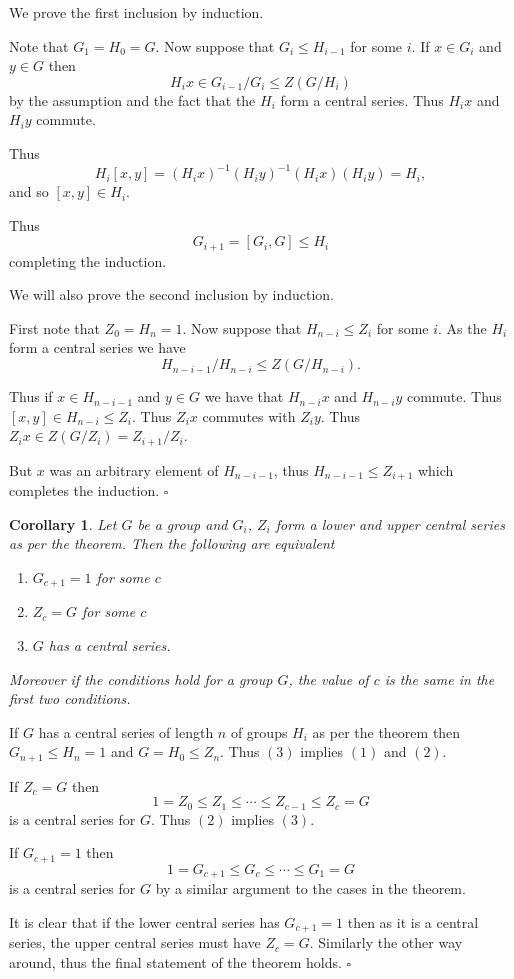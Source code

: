 \documentclass[10pt]{article}
\newtheorem{corollary}[theorem]{Corollary}
\newenvironment{proof}[1][Proof]{\begin{trivlist}
\item[\hskip \labelsep {\itshape #1}]}{\end{trivlist}}
\begin{document}
\begin{proof}
We prove the first inclusion by induction.

Note that $G_1 = H_0 = G$. Now suppose that $G_i \leq H_{i-1}$ for some $i$. If $x \in G_i$ and $y \in G$ then
$$H_ix \in G_{i-1}/G_i \leq Z(G/H_i)$$
by the assumption and the fact that the $H_i$ form a central series. Thus $H_ix$ and $H_iy$ commute.

Thus
$$H_i[x, y] = (H_ix)^{-1}(H_iy)^{-1}(H_ix)(H_iy) = H_i,$$
and so $[x, y] \in H_i$.

Thus $$G_{i+1} = [G_i, G] \leq H_i$$ completing the induction.

We will also prove the second inclusion by induction.

First note that $Z_0 = H_n = 1$. Now suppose that $H_{n-i} \leq Z_i$ for some $i$. As the $H_i$ form a central series we have
$$H_{n-i-1}/H_{n-i} \leq Z(G/H_{n-i}).$$

Thus if $x \in H_{n-i-1}$ and $y \in G$ we have that $H_{n-i}x$ and $H_{n-i}y$ commute. Thus $[x, y] \in H_{n-i} \leq Z_i$. Thus $Z_ix$ commutes with $Z_iy$. Thus $Z_ix \in Z(G/Z_i) = Z_{i+1}/Z_i$.

But $x$ was an arbitrary element of $H_{n-i-1}$, thus $H_{n-i-1} \leq Z_{i+1}$ which completes the induction. $\square$
\end{proof}

\begin{corollary}
Let $G$ be a group and $G_i$, $Z_i$ form a lower and upper central series as per the theorem. Then the following are equivalent
\begin{enumerate}
\item $G_{c+1} = 1$ for some $c$
\item $Z_c = G$ for some $c$
\item $G$ has a central series.
\end{enumerate}
Moreover if the conditions hold for a group $G$, the value of $c$ is the same in the first two conditions.
\end{corollary}

\begin{proof}
If $G$ has a central series of length $n$ of groups $H_i$ as per the theorem then $G_{n+1} \leq H_n = 1$ and $G = H_0 \leq Z_n$. Thus $(3)$ implies $(1)$ and $(2)$.

If $Z_c = G$ then
$$1 = Z_0 \leq Z_1 \leq \cdots \leq Z_{c-1} \leq Z_c = G$$
is a central series for $G$. Thus $(2)$ implies $(3)$.

If $G_{c+1} = 1$ then
$$1 = G_{c+1} \leq G_c \leq \cdots \leq G_1 = G$$
is a central series for $G$ by a similar argument to the cases in the theorem. 

It is clear that if the lower central series has $G_{c+1} = 1$ then as it is a central series, the upper central series must have $Z_c = G$. Similarly the other way around, thus the final statement of the theorem holds. $\square$
\end{proof}
\end{document}
